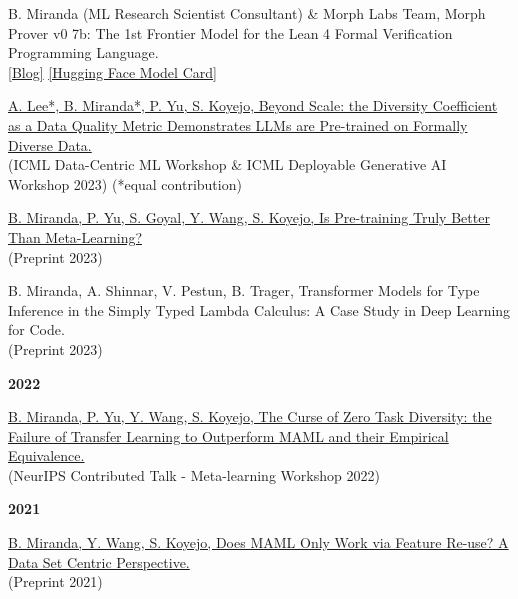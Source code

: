 \documentclass{article}
\newenvironment{changemargin}[2]{%
  \begin{list}{}{%
    \setlength{\topsep}{0pt}%
    \setlength{\leftmargin}{#1}%
    \setlength{\rightmargin}{#2}%
    \setlength{\listparindent}{\parindent}%
    \setlength{\itemindent}{\parindent}%
    \setlength{\parsep}{\parskip}%
  }%
  \item[]}{\end{list}
}
\newenvironment{body} {
	\vspace*{-16pt}
	\begin{changemargin}{-0.25in}{-0.5in}
  }	
	{\end{changemargin}
}
\begin{document}
\begin{body}
    \vspace{10pt}
    {B. Miranda (ML Research Scientist Consultant) \& Morph Labs Team,
    Morph Prover v0 7b: The 1st Frontier Model for the Lean 4 Formal Verification Programming Language.}
    \\
    \href{https://morph.so/blog/the-personal-ai-proof-engineer/}{[Blog]}
    \href{https://huggingface.co/morph-labs/morph-prover-v0-7b}{[Hugging Face Model Card]}

    \vspace{10pt}
    \href{https://arxiv.org/abs/2306.13840}
    {A. Lee*, B. Miranda*, P. Yu, S. Koyejo,
    Beyond Scale: the Diversity Coefficient as a Data Quality Metric Demonstrates LLMs are Pre-trained on Formally Diverse Data.}
    \\
    (ICML Data-Centric ML Workshop \& ICML Deployable Generative AI Workshop 2023) (*equal contribution)

    \vspace{10pt}
    \href{https://arxiv.org/abs/2306.13841}
    {B. Miranda, P. Yu, S. Goyal, Y. Wang, S. Koyejo,
    Is Pre-training Truly Better Than Meta-Learning?}
    \\
    (Preprint 2023)

    \vspace{10pt}
    {B. Miranda, A. Shinnar, V. Pestun, B. Trager,
    Transformer Models for Type Inference in the Simply Typed Lambda Calculus: A Case Study in Deep Learning for Code.}
    \\
    (Preprint 2023)

    \vspace{12pt}
    \textbf{\large 2022}
    \vspace{4pt}

    \vspace{10pt}
    \href{https://arxiv.org/abs/2208.01545}
    {B. Miranda, P. Yu, Y. Wang, S. Koyejo,
    The Curse of Zero Task Diversity: the Failure of Transfer Learning to Outperform MAML and their Empirical Equivalence.}
    \\
    (NeurIPS Contributed Talk - Meta-learning Workshop 2022)

    \vspace{12pt}
    \textbf{\large 2021}
    \vspace{4pt}

    \vspace{10pt}
    \href{https://arxiv.org/abs/2112.13137}
    {B. Miranda, Y. Wang, S. Koyejo,
    Does MAML Only Work via Feature Re-use? A Data Set Centric Perspective.}
    \\
    (Preprint 2021)


\end{body}
\end{document}

